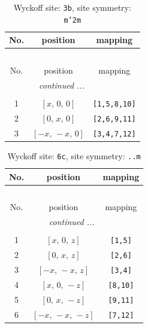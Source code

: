 \documentclass[fleqn,8pt]{jsarticle}
\begin{document}
\begin{longtable}{ccc}
\caption{Wyckoff site: {\tt 3b}, site symmetry: {\tt m'2m}}
 \\
 \hline \hline
No. & position & mapping \\ \hline \endfirsthead

\multicolumn{2}{l}{\tablename\ \thetable{}} \\
 \hline \hline
No. & position & mapping \\ \hline \endhead

 \hline \hline
\multicolumn{2}{r}{\footnotesize\it continued ...} \\ \endfoot

 \hline \hline
\multicolumn{2}{r}{} \\ \endlastfoot

1 & $\left[ x,\, 0,\, 0 \right]$ & {\tt [1,5,8,10]} \\ \hline
2 & $\left[ 0,\, x,\, 0 \right]$ & {\tt [2,6,9,11]} \\ \hline
3 & $\left[ - x,\, - x,\, 0 \right]$ & {\tt [3,4,7,12]} \\
\end{longtable}
\renewcommand{\arraystretch}{1.2}
\begin{longtable}{ccc}
\caption{Wyckoff site: {\tt 6c}, site symmetry: {\tt ..m}}
 \\
 \hline \hline
No. & position & mapping \\ \hline \endfirsthead

\multicolumn{2}{l}{\tablename\ \thetable{}} \\
 \hline \hline
No. & position & mapping \\ \hline \endhead

 \hline \hline
\multicolumn{2}{r}{\footnotesize\it continued ...} \\ \endfoot

 \hline \hline
\multicolumn{2}{r}{} \\ \endlastfoot

1 & $\left[ x,\, 0,\, z \right]$ & {\tt [1,5]} \\ \hline
2 & $\left[ 0,\, x,\, z \right]$ & {\tt [2,6]} \\ \hline
3 & $\left[ - x,\, - x,\, z \right]$ & {\tt [3,4]} \\ \hline
4 & $\left[ x,\, 0,\, - z \right]$ & {\tt [8,10]} \\ \hline
5 & $\left[ 0,\, x,\, - z \right]$ & {\tt [9,11]} \\ \hline
6 & $\left[ - x,\, - x,\, - z \right]$ & {\tt [7,12]} \\
\end{longtable}
\end{document}
